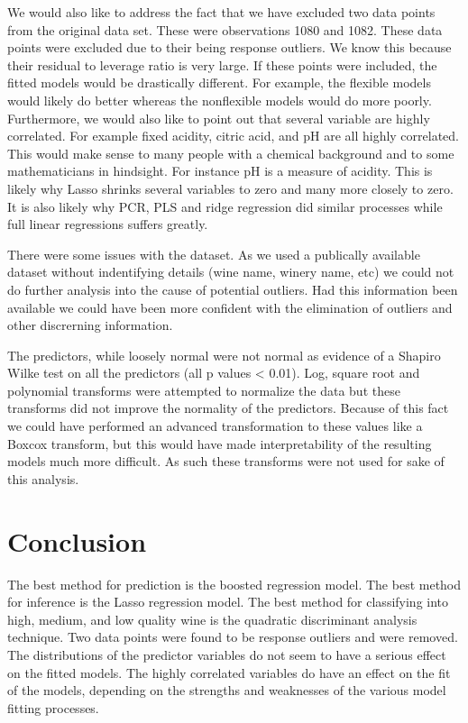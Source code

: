 \documentclass[]{article}
\begin{document}
We would also like to address the fact that we have excluded two data
points from the original data set. These were observations 1080 and
1082. These data points were excluded due to their being response
outliers. We know this because their residual to leverage ratio is very
large. If these points were included, the fitted models would be
drastically different. For example, the flexible models would likely do
better whereas the nonflexible models would do more poorly. Furthermore,
we would also like to point out that several variable are highly
correlated. For example fixed acidity, citric acid, and pH are all
highly correlated. This would make sense to many people with a chemical
background and to some mathematicians in hindsight. For instance pH is a
measure of acidity. This is likely why Lasso shrinks several variables
to zero and many more closely to zero. It is also likely why PCR, PLS
and ridge regression did similar processes while full linear regressions
suffers greatly.

There were some issues with the dataset. As we used a publically
available dataset without indentifying details (wine name, winery name,
etc) we could not do further analysis into the cause of potential
outliers. Had this information been available we could have been more
confident with the elimination of outliers and other discrerning
information.

The predictors, while loosely normal were not normal as evidence of a
Shapiro Wilke test on all the predictors (all p values \textless{}
0.01). Log, square root and polynomial transforms were attempted to
normalize the data but these transforms did not improve the normality of
the predictors. Because of this fact we could have performed an advanced
transformation to these values like a Boxcox transform, but this would
have made interpretability of the resulting models much more difficult.
As such these transforms were not used for sake of this analysis.

\section{Conclusion}\label{conclusion}

The best method for prediction is the boosted regression model. The best
method for inference is the Lasso regression model. The best method for
classifying into high, medium, and low quality wine is the quadratic
discriminant analysis technique. Two data points were found to be
response outliers and were removed. The distributions of the predictor
variables do not seem to have a serious effect on the fitted models. The
highly correlated variables do have an effect on the fit of the models,
depending on the strengths and weaknesses of the various model fitting
processes.
\end{document}
